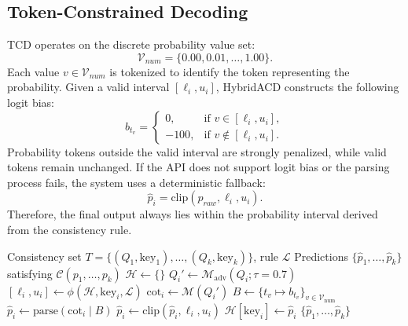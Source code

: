 \documentclass[pdflatex,sn-mathphys-num]{sn-jnl}
\begin{document}
\subsection{Token-Constrained Decoding}

TCD operates on the discrete probability value set:
\[
  \mathcal{V}_{num}=\{0.00,0.01,\ldots,1.00\}.
\]
Each value $v\in\mathcal{V}_{num}$ is tokenized to identify the token representing the probability. Given a valid interval $[\ell_i,u_i]$, HybridACD constructs the following logit bias:
\begin{equation}
  b_{t_v} =
  \begin{cases}
    0, & \text{if } v \in [\ell_i,u_i],\\
    -100, & \text{if } v \notin [\ell_i,u_i].
  \end{cases}
\end{equation}
Probability tokens outside the valid interval are strongly penalized, while valid tokens remain unchanged. If the API does not support logit bias or the parsing process fails, the system uses a deterministic fallback:
\begin{equation}
  \hat{p}_i=\text{clip}(p_{raw},\ell_i,u_i).
\end{equation}
Therefore, the final output always lies within the probability interval derived from the consistency rule.

\begin{algorithm}
\caption{HybridACD Inference Pipeline}
\label{alg:hybridacd}
\begin{algorithmic}[1]
\Require Consistency set $T = \{(Q_1, \text{key}_1), \ldots, (Q_k, \text{key}_k)\}$, rule $\mathcal{L}$
\Ensure Predictions $\{\hat{p}_1, \ldots, \hat{p}_k\}$ satisfying $\mathcal{C}(p_1, \ldots, p_k)$
\State $\mathcal{H} \gets \{\}$ 
  \State $Q_i' \gets \mathcal{M}_\text{adv}(Q_i; \tau=0.7)$ 
  \State $[\ell_i, u_i] \gets \phi(\mathcal{H}, \text{key}_i, \mathcal{L})$ 
  \State $\text{cot}_i \gets \mathcal{M}(Q_i')$ 
  \State $B \gets \{t_v \mapsto b_{t_v}\}_{v \in \mathcal{V}_\text{num}}$ 
  \State $\hat{p}_i \gets \text{parse}(\text{cot}_i \mid B)$ 
  \State $\hat{p}_i \gets \text{clip}(\hat{p}_i, \ell_i, u_i)$ 
  \State $\mathcal{H}[\text{key}_i] \gets \hat{p}_i$ 
\EndFor
\State \Return $\{\hat{p}_1, \ldots, \hat{p}_k\}$
\end{algorithmic}
\end{algorithm}
\end{document}
